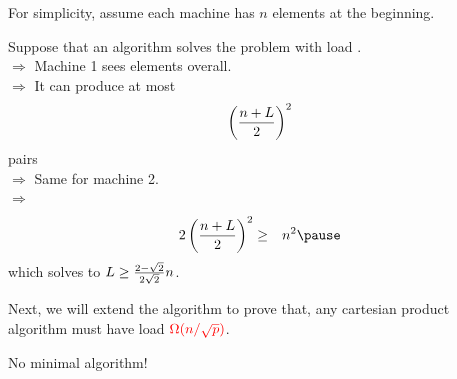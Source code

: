 \documentclass{beamer}
\def\vgap{\vspace{5mm}}
\begin{document}
\begin{frame}
\begin{small}
    
    \vgap 
    
    For simplicity, assume each machine has $n$ elements at the beginning. 
    
    \vgap 
    
    
    Suppose that an algorithm solves the problem with load . \\ \pause 
    $\Rightarrow$ Machine 1 sees  elements overall. \\ \pause
    $\Rightarrow$ It can produce at most $$\left(\frac{n + L}{2}\right)^2$$ pairs\\ \pause 
    $\Rightarrow$ Same for machine 2. \\ \pause 
    $\Rightarrow$ 
    \begin{eqnarray} 
        2 \left(\fr{n + L}{2}\right)^2 &\ge& n^2 \nn \pause
    \end{eqnarray}
    which solves to $L \ge \frac{2 - \sqrt{2}}{2\sqrt{2}} n$. 
\end{small}
\end{frame}
\begin{frame}
\begin{small}
    
    \vgap 
    
    Next, we will extend the algorithm to prove that, any cartesian product algorithm must have load $\textcolor{red}{\Omega(n / \sqrt{p})}$. 
    
    \vgap
    
     No minimal algorithm!  
    
\end{small}
\end{frame}
\end{document}
